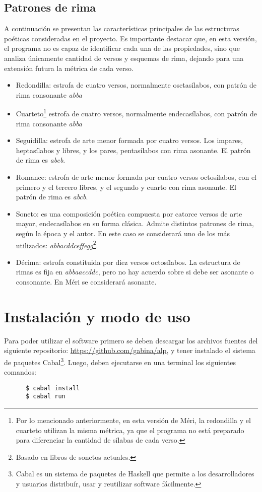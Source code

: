 \documentclass[12pt, a4paper]{article}
\begin{document}
\subsection*{Patrones de rima}
A continuación se presentan las características principales de las estructuras poéticas consideradas en el proyecto. Es importante destacar que, en esta versión, el programa no es capaz de identificar cada una de las propiedades, sino que analiza únicamente cantidad de versos y esquemas de rima, dejando para una extensión futura la métrica de cada verso.
\begin{itemize}
	\item Redondilla: estrofa de cuatro versos, normalmente osctasílabos, con patrón de rima consonante \textit{abba}
	\item Cuarteto\footnote{Por lo mencionado anteriormente, en esta versión de Méri, la redondilla y el cuarteto utilizan la misma métrica, ya que el programa no está preparado para diferenciar la cantidad de sílabas de cada verso.} estrofa de cuatro versos, normalmente endecasílabos, con patrón de rima consonante \textit{abba}
	\item Seguidilla: estrofa de arte menor formada por cuatro versos. Los impares, heptasílabos y libres, y los pares, pentasílabos con rima asonante. El patrón de rima es \textit{abcb}.
	\item Romance: estrofa de arte menor formada por cuatro versos octosílabos, con el primero y el tercero libres, y el segundo y cuarto con rima asonante. El patrón de rima es \textit{abcb}.
	\item Soneto: es una composición poética compuesta por catorce versos de arte mayor, endecasílabos en su forma clásica. Admite distintos patrones de rima, según la época y el autor. En este caso se considerará uno de los más utilizados: \textit{abbacddceffegg}\footnote{Basado en libros de sonetos actuales.}.
	\item Décima:  estrofa constituida por diez versos octosílabos. La estructura de rimas es fija en \textit{abbaaccddc}, pero no hay acuerdo sobre si debe ser asonante o consonante. En Méri se considerará asonante.

\end{itemize}

\section*{Instalación y modo de uso}
Para poder utilizar el software primero se deben descargar los archivos fuentes del siguiente repositorio: \url{https://github.com/gabina/alp}, y tener instalado el sistema de paquetes Cabal\footnote{Cabal es un sistema de paquetes de Haskell que permite a los desarrolladores y usuarios distribuír, usar y reutilizar software fácilmente.}. Luego, deben ejecutarse en una terminal los siguientes comandos:
\begin{verbatim}
      $ cabal install
      $ cabal run
\end{verbatim}
\end{document}
